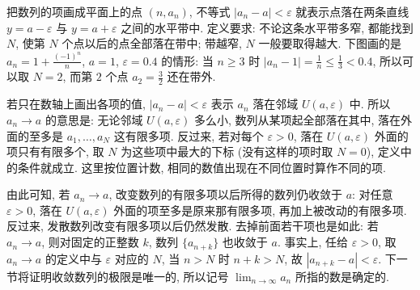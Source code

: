 \documentclass[UTF8,openany]{ctexbook}
\theoremstyle{chinesetextbook}
\begin{document}
把数列的项画成平面上的点 $(n,a_n)$, 不等式 $|a_n-a|<\varepsilon$ 就表示点落在两条直线 $y=a-\varepsilon$ 与 $y=a+\varepsilon$ 之间的水平带中. 定义要求: 不论这条水平带多窄, 都能找到 $N$, 使第 $N$ 个点以后的点全部落在带中; 带越窄, $N$ 一般要取得越大. 下图画的是 $\displaystyle a_n=1+\frac{(-1)^n}n$, $a=1$, $\varepsilon=0.4$ 的情形: 当 $n\ge3$ 时 $\displaystyle|a_n-1|=\frac1n\le\frac13<0.4$, 所以可以取 $N=2$, 而第 $2$ 个点 $\displaystyle a_2=\frac32$ 还在带外.
\begin{center}
\end{center}

若只在数轴上画出各项的值, $|a_n-a|<\varepsilon$ 表示 $a_n$ 落在邻域 $U(a,\varepsilon)$ 中. 所以 $a_n\to a$ 的意思是: 无论邻域 $U(a,\varepsilon)$ 多么小, 数列从某项起全部落在其中, 落在外面的至多是 $a_1,\ldots,a_N$ 这有限多项. 反过来, 若对每个 $\varepsilon>0$, 落在 $U(a,\varepsilon)$ 外面的项只有有限多个, 取 $N$ 为这些项中最大的下标 (没有这样的项时取 $N=0$), 定义中的条件就成立. 这里按位置计数, 相同的数值出现在不同位置时算作不同的项.

由此可知, 若 $a_n\to a$, 改变数列的有限多项以后所得的数列仍收敛于 $a$: 对任意 $\varepsilon>0$, 落在 $U(a,\varepsilon)$ 外面的项至多是原来那有限多项, 再加上被改动的有限多项. 反过来, 发散数列改变有限多项以后仍然发散. 去掉前面若干项也是如此: 若 $a_n\to a$, 则对固定的正整数 $k$, 数列 $\{a_{n+k}\}$ 也收敛于 $a$. 事实上, 任给 $\varepsilon>0$, 取 $a_n\to a$ 的定义中与 $\varepsilon$ 对应的 $N$, 当 $n>N$ 时 $n+k>N$, 故 $|a_{n+k}-a|<\varepsilon$. 下一节将证明收敛数列的极限是唯一的, 所以记号 $\displaystyle\lim_{n\to\infty}a_n$ 所指的数是确定的.
\end{document}
